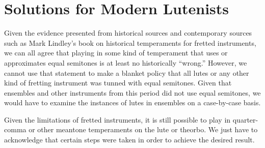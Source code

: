 \chapter{Solutions for Modern Lutenists}

Given the evidence presented from historical sources and contemporary sources such
as Mark Lindley's book on historical temperaments for fretted instruments, we can all
agree that playing in some kind of temperament that uses or approximates equal semitones
is at least no historically ``wrong.''  However, we cannot use that statement to make
a blanket policy that all lutes or any other kind of fretting instrument was tunned with
equal semitones.  Given that ensembles and other instruments from this period did not
use equal semitones, we would have to examine the instances of lutes in ensembles
on a case-by-case basis.

Given the limitations of fretted instruments, it is still possible to
play in quarter-comma or other meantone temperaments on the lute or theorbo.  We just
have to acknowledge that certain steps were taken in order to achieve the desired result.
